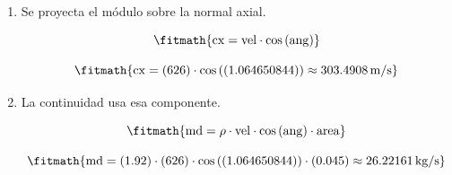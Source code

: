 \begin{enumerate}

\item Se proyecta el módulo sobre la normal axial.

\[\fitmath{\mathrm{cx}=\mathrm{vel}\cdot \cos\left(\mathrm{ang}\right)}\]

\[\fitmath{\mathrm{cx}=(626)\cdot \cos\left((1.064650844)\right)\approx 303.4908\,\mathrm{m/s}}\]

\item La continuidad usa esa componente.

\[\fitmath{\mathrm{md}=\rho\cdot \mathrm{vel}\cdot \cos\left(\mathrm{ang}\right)\cdot \mathrm{area}}\]

\[\fitmath{\mathrm{md}=(1.92)\cdot (626)\cdot \cos\left((1.064650844)\right)\cdot (0.045)\approx 26.22161\,\mathrm{kg/s}}\]

\end{enumerate}
